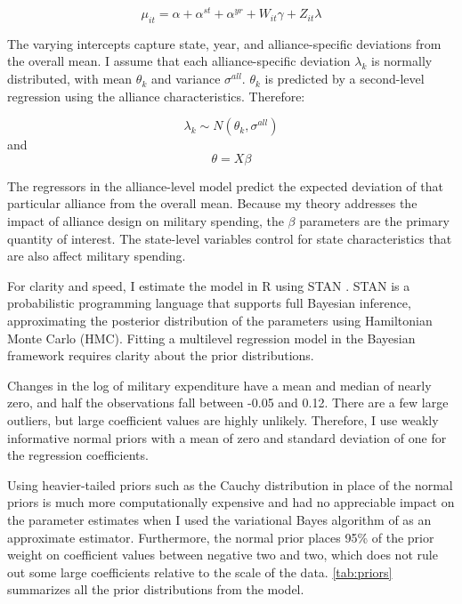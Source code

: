 \documentclass[12pt]{article}
\begin{document}
\begin{equation}
\mu_{it} = \alpha + \alpha^{st} + \alpha^{yr} + W_{it} \gamma + Z_{it} \lambda 
\end{equation}

The varying intercepts capture state, year, and alliance-specific deviations from the overall mean. I assume that each alliance-specific deviation $\lambda_k$ is normally distributed, with mean $\theta_k$ and variance $\sigma^{all}$. $\theta_k$ is predicted by a second-level regression using the alliance characteristics. Therefore:

\begin{equation}
\lambda_k \sim N(\theta_k , \sigma^{all})
\end{equation} 
and 
\begin{equation}
\theta = X \beta
\end{equation}

The regressors in the alliance-level model predict the expected deviation of that particular alliance from the overall mean. Because my theory addresses the impact of alliance design on military spending, the $\beta$ parameters are the primary quantity of interest. The state-level variables control for state characteristics that are also affect military spending. 

For clarity and speed, I estimate the model in \textsf{R} using STAN \citep{Carpenteretal2016}. STAN is a probabilistic programming language that supports full Bayesian inference, approximating the posterior distribution of the parameters using Hamiltonian Monte Carlo (HMC). Fitting a multilevel regression model in the Bayesian framework requires clarity about the prior distributions. 

Changes in the log of military expenditure have a mean and median of nearly zero, and half the observations fall between -0.05 and 0.12. There are a few large outliers, but large coefficient values are highly unlikely. Therefore, I use weakly informative normal priors with a mean of zero and standard deviation of one for the regression coefficients. 

Using heavier-tailed priors such as the Cauchy distribution in place of the normal priors is much more computationally expensive and had no appreciable impact on the parameter estimates when I used the variational Bayes algorithm of \citep{Kucukelbiretal2015} as an approximate estimator. Furthermore, the normal prior places 95\% of the prior weight on coefficient values between negative two and two, which does not rule out some large coefficients relative to the scale of the data. \autoref{tab:priors} summarizes all the prior distributions from the model. 
\end{document}

